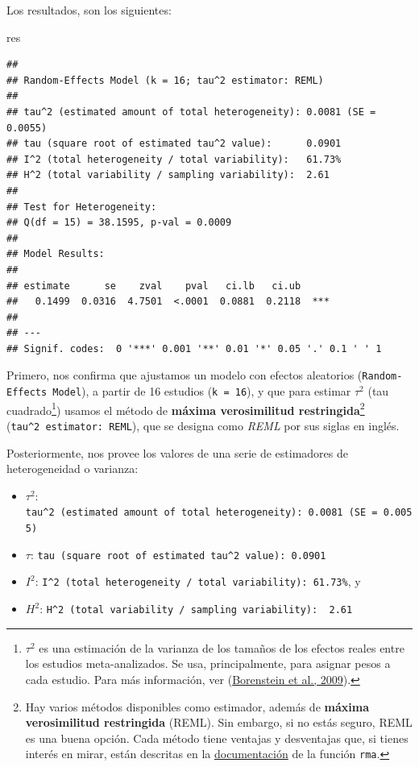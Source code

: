 \documentclass[
]{article}
\newenvironment{Shaded}{\begin{snugshade}}{\end{snugshade}}
\newcommand{\NormalTok}[1]{\textcolor[rgb]{0.80,0.80,0.80}{#1}}
\begin{document}
Los resultados, son los siguientes:

\begin{Shaded}
\begin{Highlighting}[]
\NormalTok{res}
\end{Highlighting}
\end{Shaded}

\begin{verbatim}
## 
## Random-Effects Model (k = 16; tau^2 estimator: REML)
## 
## tau^2 (estimated amount of total heterogeneity): 0.0081 (SE = 0.0055)
## tau (square root of estimated tau^2 value):      0.0901
## I^2 (total heterogeneity / total variability):   61.73%
## H^2 (total variability / sampling variability):  2.61
## 
## Test for Heterogeneity:
## Q(df = 15) = 38.1595, p-val = 0.0009
## 
## Model Results:
## 
## estimate      se    zval    pval   ci.lb   ci.ub 
##   0.1499  0.0316  4.7501  <.0001  0.0881  0.2118  *** 
## 
## ---
## Signif. codes:  0 '***' 0.001 '**' 0.01 '*' 0.05 '.' 0.1 ' ' 1
\end{verbatim}

Primero, nos confirma que ajustamos un modelo con efectos aleatorios
(\texttt{Random-Effects\ Model}), a partir de 16 estudios
(\texttt{k\ =\ 16}), y que para estimar \(\tau^2\) (tau
cuadrado\footnote{\(\tau^2\) es una estimación de la varianza de los
  tamaños de los efectos reales entre los estudios meta-analizados. Se
  usa, principalmente, para asignar pesos a cada estudio. Para más
  información, ver
  (\protect\hyperlink{ref-borensteinIdentifyingQuantifyingHeterogeneity2009}{Borenstein
  et al., 2009}).}) usamos el método de \textbf{máxima verosimilitud
restringida}\footnote{Hay varios métodos disponibles como estimador,
  además de \textbf{máxima verosimilitud restringida} (REML). Sin
  embargo, si no estás seguro, REML es una buena opción. Cada método
  tiene ventajas y desventajas que, si tienes interés en mirar, están
  descritas en la
  \href{https://www.rdocumentation.org/packages/metafor/versions/2.4-0/topics/rma.uni}{documentación}
  de la función \texttt{rma}.} (\texttt{tau\^{}2\ estimator:\ REML}),
que se designa como \emph{REML} por sus siglas en inglés.

Posteriormente, nos provee los valores de una serie de estimadores de
heterogeneidad o varianza:

\begin{itemize}
\item
  \(\tau^2\):
  \texttt{tau\^{}2\ (estimated\ amount\ of\ total\ heterogeneity):\ 0.0081\ (SE\ =\ 0.0055)}
\item
  \(\tau\):
  \texttt{tau\ (square\ root\ of\ estimated\ tau\^{}2\ value):\ 0.0901}
\item
  \(I^2\):
  \texttt{I\^{}2\ (total\ heterogeneity\ /\ total\ variability):\ 61.73\%},
  y
\item
  \(H^2\):
  \texttt{H\^{}2\ (total\ variability\ /\ sampling\ variability):\ \ 2.61}
\end{itemize}
\end{document}
